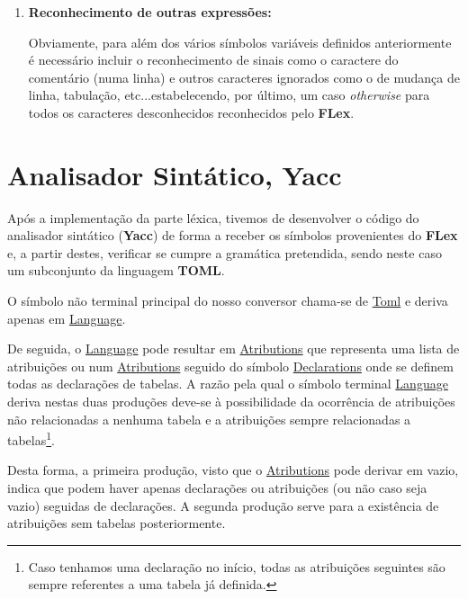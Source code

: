 \documentclass[a4paper,12pt]{report}
\begin{document}
\begin{enumerate}
\begin{verbatim}
Regex (atribuição, parenteses): [\[\]=,] { IS_RHS = 1; ... }
Regex (ponto, comentário): [.#] { IS_RHS = 0; ... }    
\end{verbatim}

    \item \textbf{Reconhecimento de outras expressões:}
    
    Obviamente, para além dos vários símbolos variáveis definidos anteriormente é necessário incluir o reconhecimento de sinais como o caractere do comentário (numa linha) e outros caracteres ignorados como o de mudança de linha, tabulação, etc...estabelecendo, por último, um caso \textit{otherwise} para todos os caracteres desconhecidos reconhecidos pelo \textbf{FLex}.

\end{enumerate}


\section{Analisador Sintático, Yacc} 

\par Após a implementação da parte léxica, tivemos de desenvolver o código do analisador sintático (\textbf{Yacc}) de forma a receber os símbolos provenientes do \textbf{FLex} e, a partir destes, verificar se cumpre a gramática pretendida, sendo neste caso um subconjunto da linguagem \textbf{TOML}.

\vspace{0.3cm}
O símbolo não terminal principal do nosso conversor chama-se de \underline{Toml} e deriva apenas em \underline{Language}. 
\par De seguida, o \underline{Language} pode resultar em \underline{Atributions} que representa uma lista de atribuições ou num \underline{Atributions} seguido do símbolo \underline{Declarations} onde se definem todas as declarações de tabelas. A razão pela qual o símbolo terminal \underline{Language} deriva nestas duas produções deve-se à possibilidade da ocorrência de atribuições não relacionadas a nenhuma tabela e a atribuições sempre relacionadas a tabelas\footnote{Caso tenhamos uma declaração no início, todas as atribuições seguintes são sempre referentes a uma tabela já definida.}. 
\par Desta forma, a primeira produção, visto que o \underline{Atributions} pode derivar em vazio, indica que podem haver apenas declarações ou atribuições (ou não caso seja vazio) seguidas de declarações. A segunda produção serve para a existência de atribuições sem tabelas posteriormente.
\end{document}
